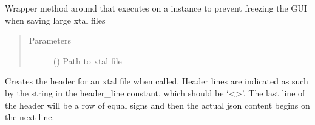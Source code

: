 \documentclass[letterpaper,10pt,english]{sphinxmanual}
\begin{document}
\begin{fulllineitems}
\begin{fulllineitems}
\begin{quote}
\begin{description}
\end{description}\end{quote}

\end{fulllineitems}


\begin{fulllineitems}
\label{\detokenize{polo.utils:polo.utils.io_utils.XtalWriter.write_xtal_file_on_thread}}
Wrapper method around {\hyperref[\detokenize{polo.utils:polo.utils.io_utils.XtalWriter.write_xtal_file}]{}} 
that executes on a  instance to prevent freezing the 
GUI when saving large xtal files
\begin{quote}\begin{description}
\item[{Parameters}] \leavevmode
{} () \textendash{} Path to xtal file

\end{description}\end{quote}

\end{fulllineitems}


\begin{fulllineitems}
\label{\detokenize{polo.utils:polo.utils.io_utils.XtalWriter.xtal_header}}
Creates the header for an xtal file when called. Header lines are
indicated as such by the string in the header\_line constant,
which should be ‘\textless{}\textgreater{}’. The last line of the header will be a row
of equal signs and then the actual json content begins on the
next line.

\end{fulllineitems}


\end{fulllineitems}
\end{document}
